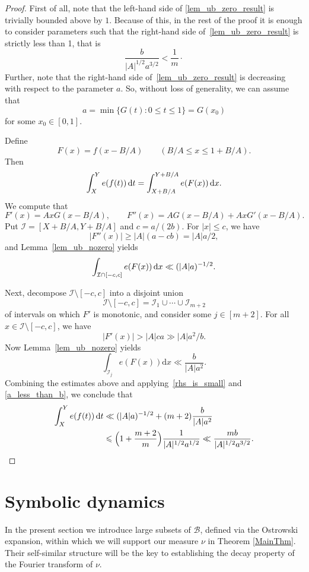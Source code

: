 \documentclass[12pt, reqno]{amsart}
\theoremstyle{definition}
\theoremstyle{remark}
\numberwithin{equation}{section}
\def\le{\leqslant} \def\ge{\geqslant}
\def\leq{\leqslant}
\def\d{{\,{\rm d}}}
\def \cB {\mathcal B}
\def \cI {\mathcal I}
\begin{document}
\begin{proof}
First of all, note that the left-hand side of \eqref{lem_ub_zero_result} is trivially  bounded above by $1$. 
Because of this, in the rest of the proof it is enough to consider parameters such that the right-hand side of~\eqref{lem_ub_zero_result} is strictly less than 1, that is 
\begin{equation} \label{rhs_is_small}
\frac{b}{|A|^{1/2} a^{3/2}} < \frac{1}{m} \cdot 
\end{equation}
Further, note that the right-hand side of~\eqref{lem_ub_zero_result} is decreasing with respect to the parameter $a$. So, without loss of generality, we can assume that
\begin{equation} \label{a_is_min_g}
a = \min \{ G(t): 0 \le t \le 1 \} = G(x_0)
\end{equation}
for some $x_0 \in [0,1].$ 

Define
\[
F(x) = f(x-B/A)  \qquad (B/A \le x \le 1+B/A).
\]
Then
\[
\int_X^Y e(f(t)) \d t =   \int_{X+B/A}^{Y+B/A} e(F(x)) \d x.
\]
We compute that
\[
F'(x) = A x G(x - B/A), \qquad
F''(x) = A G(x - B/A) + A x G'(x - B/A).
\]
Put $\cI = [X+B/A, Y+B/A]$ and $c = a/(2b)$. For $|x| \le c$, we have
\[
|F''(x)| \ge |A| (a - cb) = |A|a/2,
\]
and Lemma~\ref{lem_ub_nozero} 
yields
\[
\int_{\cI \cap [-c,c]} e(F(x)) \d x \ll (|A| a)^{-1/2}.
\]

Next, decompose $\cI \setminus [-c,c]$ into a disjoint union
\[
\cI \setminus [-c,c] = \cI_1 \cup \cdots \cup \cI_{m+2}
\]
of intervals on which $F'$ is monotonic, and consider some 
$j \in [m+2]$.
For all $x\in \cI \setminus 
[-c, c]$, we have
\[
|F'(x)| > |A|ca \gg |A|a^2/b.
\]
Now Lemma~\ref{lem_ub_nozero} yields
\[
\int_{\cI_j} e(F(x))
\mathrm{d}x \ll \frac{b}{|A|a^2}.
\]
Combining the estimates above and applying~\eqref{rhs_is_small} and \eqref{a_less_than_b}, we conclude that 
\begin{align*}
\int_X^Y e(f(t)) \d t &\ll (|A|a)^{-1/2} + (m+2)\frac{b}{|A|a^{2}} \\ &\leq 
\Big(1 + \frac{m+2}{m}\Big) 
\frac{1}{|A|^{1/2} a^{1/2}} 
\ll \frac{mb}{|A|^{1/2} a^{3/2}}.
\end{align*}
\end{proof}

\section{Symbolic dynamics}
\label{SymbolicDynamics}

In the present section we introduce large subsets of $\cB$, defined via the Ostrowski expansion, within which we will support our measure $\nu$ in Theorem \ref{MainThm}. Their self-similar structure will be the key to establishing the decay property of the Fourier transform of $\nu.$ 
\end{document}
